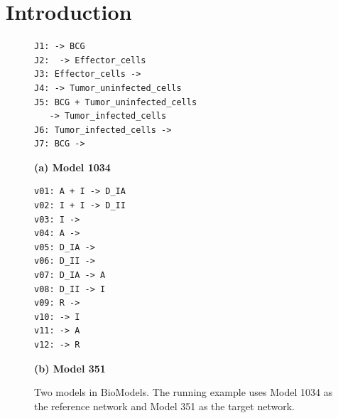 \documentclass[webpdf,contemporary,large]{oup-authoring-template}
\theoremstyle{thmstyleone}%
\theoremstyle{thmstyletwo}%
\theoremstyle{thmstylethree}%
\begin{document}

\maketitle

\section{Introduction}

\begin{figure}%
\centering
\begin{minipage}{1.3in}
{\tiny
\begin{verbatim}
J1: -> BCG
J2:  -> Effector_cells
J3: Effector_cells ->
J4: -> Tumor_uninfected_cells
J5: BCG + Tumor_uninfected_cells 
   -> Tumor_infected_cells
J6: Tumor_infected_cells ->
J7: BCG ->
\end{verbatim}
\vspace{0.38in}
{\bf (a) Model 1034}
}
\end{minipage}
\qquad
\begin{minipage}{1.3in}%
{\tiny
\begin{verbatim}
v01: A + I -> D_IA
v02: I + I -> D_II
v03: I ->
v04: A ->
v05: D_IA ->
v06: D_II ->
v07: D_IA -> A
v08: D_II -> I
v09: R ->
v10: -> I
v11: -> A
v12: -> R 
\end{verbatim}
{\bf (b) Model 351}
}
\end{minipage}%
\caption{Two models in BioModels. The running example uses Model 1034 as the reference network and Model 351 as the target network.}
\label{fig:running-example-models}
\end{figure}
\end{document}
